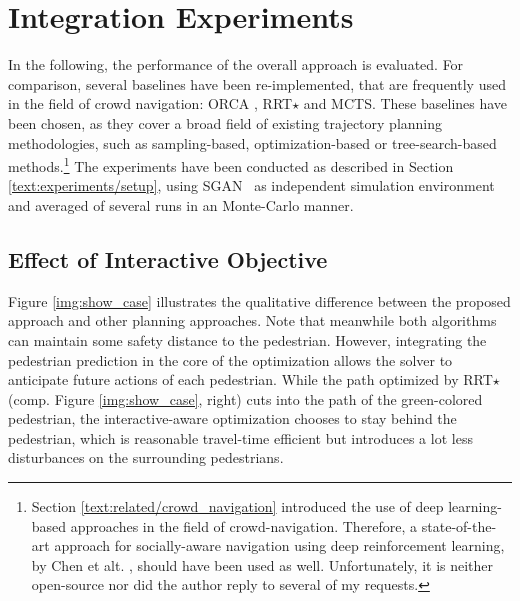 \section{Integration Experiments}
\label{text:experiments/integration}
In the following, the performance of the overall approach is evaluated. For comparison, several baselines have been re-implemented, that are frequently used in the field of crowd navigation: \ac{ORCA} \cite{vandenBerg2011}, \ac{RRT}$\star$ \cite{Karaman2011} and \ac{MCTS}. These baselines have been chosen, as they cover a broad field of existing trajectory planning methodologies, such as sampling-based, optimization-based or tree-search-based methods.\footnote{Section \ref{text:related/crowd_navigation} introduced the use of deep learning-based approaches in the field of crowd-navigation. Therefore, a state-of-the-art approach for socially-aware navigation using deep reinforcement learning, by Chen et alt. \cite{Chen2017}, should have been used as well. Unfortunately, it is neither open-source nor did the author reply to several of my requests.} The experiments have been conducted as described in Section \ref{text:experiments/setup}, using \ac{SGAN} \cite{Gupta2018} as independent simulation environment and averaged of several runs in an Monte-Carlo manner.

\subsection{Effect of Interactive Objective}
Figure \ref{img:show_case} illustrates the qualitative difference between the proposed approach and other planning approaches. Note that meanwhile both algorithms can maintain some safety distance to the pedestrian. However, integrating the pedestrian prediction in the core of the optimization allows the solver to anticipate future actions of each pedestrian. While the path optimized by \ac{RRT}$\star$ (comp. Figure \ref{img:show_case}, right) cuts into the path of the green-colored pedestrian, the interactive-aware optimization chooses to stay behind the pedestrian, which is reasonable travel-time efficient but introduces a lot less disturbances on the surrounding pedestrians. 


